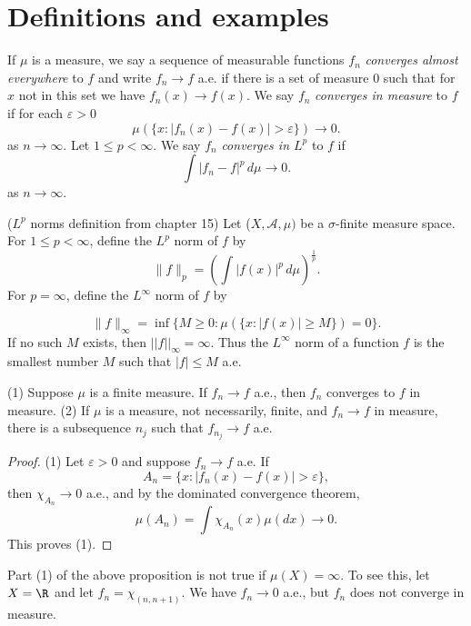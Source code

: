 \begin{sloppypar}
\section{Definitions and examples}
\begin{definition}
  If $\mu$ is a measure, we say a sequence of measurable functions $f_n$ \textit{converges almost everywhere} to $f$ and write $f_n \to f$ a.e. if there is a set of measure $0$ such that for $x$ not in this set we have $f_n(x) \to f(x)$.
  \newline We say $f_n$ \textit{converges in measure} to $f$ if for each $ \varepsilon > 0$ 
  \[
  \mu( \{x : |f_n(x) - f(x)| > \varepsilon\} ) \to 0
.\] as $n \to \infty$.
\newline Let $1 \le p < \infty$. We say $f_n$ \textit{converges in $L^p$ } to $f$ if
  \[
  \int|f_n - f|^p \,d\mu \to 0
  .\] as $n \to \infty$.
\end{definition}

\begin{definition}
  ($L^p$ norms definition from chapter 15) Let ($X, \mathcal{A},\mu)$ be a $\sigma$-finite measure space. For $1 \le p < \infty$, define the $L^p$ norm of $f$ by
  \[
    \|f\|_{p} = (\int |f(x)|^p \,d\mu)^{\frac{1}{p}} 
  .\] 
For $p = \infty$, define the $L^\infty$ norm of $f$ by

\[
\|f\|_\infty = \inf \{M \ge 0 : \mu( \{x : |f(x)| \ge  M\}) = 0\} .
\]
If no such $M$ exists, then $||f||_\infty = \infty$. Thus the $L^\infty$ norm of a function $f$ is the smallest number $M$ such that $|f| \le M$ a.e.
\end{definition}

\begin{prop}
  (1) Suppose $\mu$ is a finite measure. If $f_n \to f$ a.e., then $f_n$ converges to $f$ in measure.
  (2) If $\mu$ is a measure, not necessarily, finite, and $f_n \to f$ in measure, there is a subsequence $n_j$ such that $f_{n_j} \to f$ a.e.
\end{prop}
\begin{proof}
  (1) Let $ \varepsilon > 0$ and suppose $f_n \to f$ a.e. If
  \[
  A_n = \{x : |f_n(x) - f(x)| > \varepsilon\} ,\] 
  then $\chi_{A_n} \to 0$ a.e., and by the dominated convergence theorem,
  \[
    \mu(A_n) = \int \chi_{A_n}(x) \mu(dx) \to 0
  .\] This proves (1).
\end{proof}

\begin{eg}
  Part (1) of the above proposition is not true if $\mu(X) = \infty$. To see this, let $X = \R$ and let $f_n = \chi_{(n,n+1)}$. We have $f_n \to 0$ a.e., but $f_n$ does not converge in measure.
\end{eg}


\end{sloppypar}
